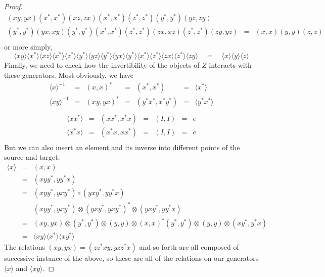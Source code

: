 \documentclass{amsbook} %
\numberwithin{section}{chapter}
\begin{document}
\begin{proof}
\[ \begin{array}{rll}
			(xy, yx)(x^*,x^*)(xz,zx)(x^*,x^*)(z^*,z^*)(y^*,y^*)(yz,zy) & & \\
			(y^*,y^*)(yx,xy)(y^*,y^*)(x^*,x^*)(z^*,z^*)(zx, xz)(z^*,z^*)(zy,yz) & = & (x,x)(y,y)(z,z) \\
		\end{array}
\]
or more simply,
\[ \langle xy \rangle \langle x^* \rangle \langle xz \rangle \langle x^* \rangle \langle z^* \rangle \langle y^* \rangle \langle yz \rangle \langle y^* \rangle \langle yx \rangle \langle y^* \rangle \langle x^* \rangle \langle z^* \rangle \langle zx \rangle \langle z^* \rangle \langle zy \rangle \quad = \quad \langle x \rangle\langle y \rangle\langle z \rangle \]
Finally, we need to check how the invertibility of the objects of $Z$ interacts with these generators. Most obviously, we have
\[ \begin{array}{rcccccl}
			\langle x \rangle^{-1} & = & (x, x)^* & = & (x^*, x^*) & = & \langle x^* \rangle \\
			\langle xy \rangle^{-1} & = & (xy, yx)^* & = & (y^*x^*, x^*y^*) & = & \langle y^*x^* \rangle \\
		\end{array}
\]
\[ \begin{array}{rcccccl}
			\langle xx^* \rangle & = & (xx^*, x^*x) & = & (I, I) & = & e \\
			\langle x^*x \rangle & = & (x^*x, xx^*) & = & (I,I) & = & e \\
		\end{array}
\]
But we can also insert an element and its inverse into different points of the source and target:
\[ \begin{array}{rll}
			\langle x \rangle & = & (x,x) \\
			& = & (xyy^*, yy^*x) \\
			& = & (xyy^*, yxy^*) \circ (yxy^*, yy^*x) \\
			& = & (xyy^*, yxy^*) \otimes (yxy^*, yxy^*)^* \otimes (yxy^*, yy^*x) \\
			& = & (xy, yx) \otimes (y^*,y^*) \otimes (y, y) \otimes (x,x)^*(y^*, y^*) \otimes (y, y) \otimes (xy^*, y^*x) \\
			& = & \langle xy \rangle \langle x^* \rangle \langle xy^* \rangle
		\end{array}
\]
The relations $(xy, yx) = (zz^*xy, yzz^*x)$ and so forth are all composed of successive instance of the above, so these are all of the relations on our generators $\langle x \rangle$ and $\langle xy \rangle$.
\end{proof}
\end{document}
